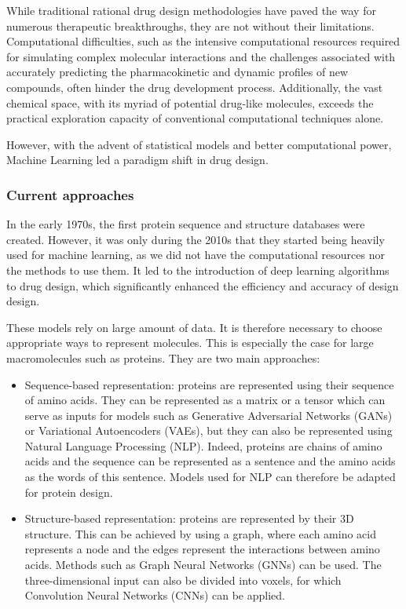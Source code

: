 While traditional rational drug design methodologies have paved the way for numerous therapeutic breakthroughs, they are not without their limitations. Computational difficulties, such as the intensive computational resources required for simulating complex molecular interactions and the challenges associated with accurately predicting the pharmacokinetic and dynamic profiles of new compounds, often hinder the drug development process. Additionally, the vast chemical space, with its myriad of potential drug-like molecules, exceeds the practical exploration capacity of conventional computational techniques alone.

However, with the advent of statistical models and better computational power, Machine Learning led a paradigm shift in drug design.

\subsubsection{Current approaches}

In the early 1970s, the first protein sequence and structure databases were created. \cite{atlasprotein} However, it was only during the 2010s that they started being heavily used for machine learning, as we did not have the computational resources nor the methods to use them. It led to the introduction of deep learning algorithms to drug design, which significantly enhanced the efficiency and accuracy of design design. \cite{Ding2022ProteinDesign}

These models rely on large amount of data. It is therefore necessary to choose appropriate ways to represent molecules. This is especially the case for large macromolecules such as proteins. They are two main approaches: \cite{Defresne2021ProteinDesign}
\begin{itemize}
  \item Sequence-based representation: proteins are represented using their sequence of amino acids. They can be represented as a matrix or a tensor which can serve as inputs for models such as Generative Adversarial Networks (GANs) or Variational Autoencoders (VAEs), but they can also be represented using Natural Language Processing (NLP). Indeed, proteins are chains of amino acids and the sequence can be represented as a sentence and the amino acids as the words of this sentence. Models used for NLP can therefore be adapted for protein design.
  \item Structure-based representation: proteins are represented by their 3D structure. This can be achieved by using a graph, where each amino acid represents a node and the edges represent the interactions between amino acids. Methods such as Graph Neural Networks (GNNs) can be used. The three-dimensional input can also be divided into voxels, for which Convolution Neural Networks (CNNs) can be applied.
\end{itemize}

